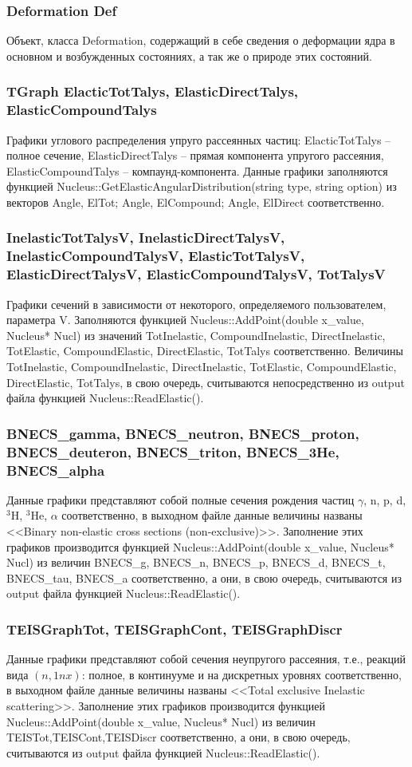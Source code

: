 \documentclass[a4paper,12pt]{extarticle}
\begin{document}
\subsubsection{Deformation Def}
Объект, класса Deformation, содержащий в себе сведения о деформации ядра в основном и возбужденных состояниях, а так же о природе этих состояний.
\subsubsection{TGraph ElacticTotTalys, ElasticDirectTalys, ElasticCompoundTalys}
Графики углового распределения упруго рассеянных частиц:  ElacticTotTalys -- полное сечение, ElasticDirectTalys -- прямая компонента упругого рассеяния, ElasticCompoundTalys -- компаунд-компонента. Данные графики заполняются функцией Nucleus::GetElasticAngularDistribution(string type, string option) из векторов Angle, ElTot; Angle, ElCompound; Angle, ElDirect соответственно.
\subsubsection{InelasticTotTalysV, InelasticDirectTalysV, InelasticCompoundTalysV, ElasticTotTalysV, ElasticDirectTalysV, ElasticCompoundTalysV, TotTalysV}
Графики сечений в зависимости от некоторого, определяемого пользователем, параметра V. Заполняются функцией Nucleus::AddPoint(double x_value, Nucleus* Nucl) из значений TotInelastic, CompoundInelastic, DirectInelastic, TotElastic, CompoundElastic, DirectElastic,  TotTalys соответственно. Величины TotInelastic, CompoundInelastic, DirectInelastic, TotElastic, CompoundElastic, DirectElastic,  TotTalys, в свою очередь, считываются непосредственно из output файла функцией Nucleus::ReadElastic().
\subsubsection{BNECS_gamma, BNECS_neutron, BNECS_proton, BNECS_deuteron, BNECS_triton, BNECS_3He, BNECS_alpha}
Данные графики представляют собой полные сечения рождения частиц $\gamma$, n, p, d, $^3$H, $^3$He, $\alpha$ соответственно, в выходном файле данные величины названы <<Binary non-elastic cross sections (non-exclusive)>>. Заполнение этих графиков производится функцией Nucleus::AddPoint(double x_value, Nucleus* Nucl) из величин BNECS_g, BNECS_n, BNECS_p, BNECS_d, BNECS_t, BNECS_tau, BNECS_a соответственно, а они, в свою очередь, считываются из output файла функцией Nucleus::ReadElastic().
\subsubsection{TEISGraphTot, TEISGraphCont, TEISGraphDiscr}
Данные графики представляют собой сечения неупругого рассеяния, т.е., реакций вида $(n,1nx)$: полное, в континууме и на дискретных уровнях соответственно, в выходном файле данные величины названы <<Total exclusive Inelastic scattering>>. Заполнение этих графиков производится функцией Nucleus::AddPoint(double x_value, Nucleus* Nucl) из величин TEISTot,TEISCont,TEISDiscr соответственно, а они, в свою очередь, считываются из output файла функцией Nucleus::ReadElastic().
\end{document}
